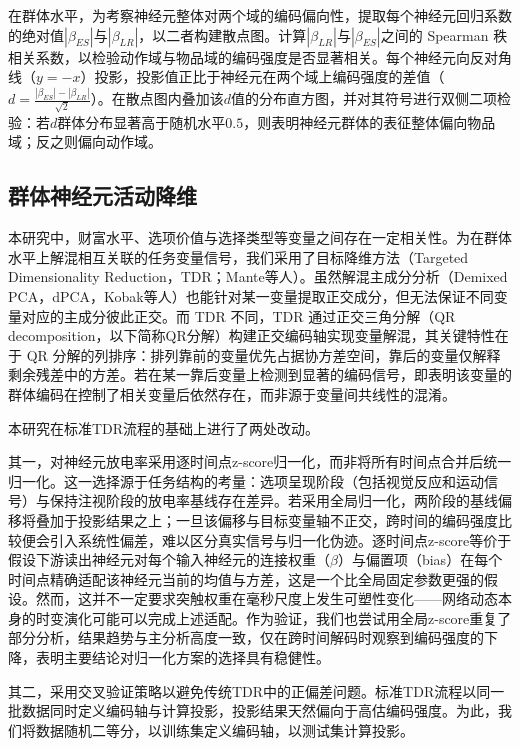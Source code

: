 在群体水平，为考察神经元整体对两个域的编码偏向性，提取每个神经元回归系数的绝对值$|\beta_{ES}|$与$|\beta_{LR}|$，以二者构建散点图。计算$|\beta_{LR}|$与$|\beta_{ES}|$之间的 Spearman 秩相关系数，以检验动作域与物品域的编码强度是否显著相关。每个神经元向反对角线（$y=-x$）投影，投影值正比于神经元在两个域上编码强度的差值（$d = \frac{|\beta_{ES}| - |\beta_{LR}|}{\sqrt{2}}$）。在散点图内叠加该$d$值的分布直方图，并对其符号进行双侧二项检验：若$d$群体分布显著高于随机水平$0.5$，则表明神经元群体的表征整体偏向物品域；反之则偏向动作域。

\subsection{群体神经元活动降维}\label{chap2:methods_neural_TDR}

本研究中，财富水平、选项价值与选择类型等变量之间存在一定相关性。为在群体水平上解混相互关联的任务变量信号，我们采用了目标降维方法（Targeted Dimensionality Reduction，TDR；Mante等人\citep{mante2013computation}）。虽然解混主成分分析（Demixed PCA，dPCA，Kobak等人\citep{kobak2016demixed}）也能针对某一变量提取正交成分，但无法保证不同变量对应的主成分彼此正交。而 TDR 不同，TDR 通过正交三角分解（QR decomposition，以下简称QR分解）构建正交编码轴实现变量解混，其关键特性在于 QR 分解的列排序：排列靠前的变量优先占据协方差空间，靠后的变量仅解释剩余残差中的方差。若在某一靠后变量上检测到显著的编码信号，即表明该变量的群体编码在控制了相关变量后依然存在，而非源于变量间共线性的混淆。

本研究在标准TDR流程的基础上进行了两处改动。

其一，对神经元放电率采用逐时间点z-score归一化，而非将所有时间点合并后统一归一化。这一选择源于任务结构的考量：选项呈现阶段（包括视觉反应和运动信号）与保持注视阶段的放电率基线存在差异。若采用全局归一化，两阶段的基线偏移将叠加于投影结果之上；一旦该偏移与目标变量轴不正交，跨时间的编码强度比较便会引入系统性偏差，难以区分真实信号与归一化伪迹。逐时间点z-score等价于假设下游读出神经元对每个输入神经元的连接权重（$\beta$）与偏置项（bias）在每个时间点精确适配该神经元当前的均值与方差，这是一个比全局固定参数更强的假设。然而，这并不一定要求突触权重在毫秒尺度上发生可塑性变化——网络动态本身的时变演化可能可以完成上述适配。作为验证，我们也尝试用全局z-score重复了部分分析，结果趋势与主分析高度一致，仅在跨时间解码时观察到编码强度的下降，表明主要结论对归一化方案的选择具有稳健性。

其二，采用交叉验证策略以避免传统TDR中的正偏差问题。标准TDR流程以同一批数据同时定义编码轴与计算投影，投影结果天然偏向于高估编码强度。为此，我们将数据随机二等分，以训练集定义编码轴，以测试集计算投影。

